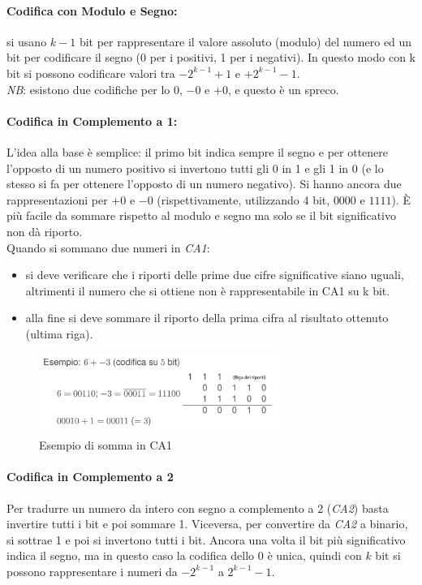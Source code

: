 \documentclass[class=book, crop=false, oneside]{standalone}
\begin{document}
\paragraph*{Codifica con Modulo e Segno:}
si usano \(k-1\) bit per rappresentare il valore assoluto (modulo) del numero  ed un bit per codificare il segno (0 per i positivi, 1 per i negativi). In questo modo con k bit si possono codificare valori tra \(-2^{k-1}+1\) e \(+2^{k-1}-1\).\\
\emph{NB}: esistono due codifiche per lo \(0\), \(-0\) e \(+0\), e questo è un spreco.

\paragraph*{Codifica in Complemento a 1:}
L'idea alla base è semplice: il primo bit indica sempre il segno e per ottenere l'opposto di un numero positivo si invertono tutti gli 0 in 1 e gli 1 in 0 (e lo stesso si fa per ottenere l’opposto di un numero negativo). Si hanno ancora due rappresentazioni per \(+0\) e \(-0\) (rispettivamente, utilizzando 4 bit, \(0000\) e \(1111\)). È più facile da sommare rispetto al modulo e segno ma solo se il bit significativo non dà riporto.\\
Quando si sommano due numeri in \emph{CA1}:
\begin{itemize}[noitemsep]
	\item si deve verificare che i riporti delle prime due cifre significative siano uguali, altrimenti il numero che si ottiene non è rappresentabile in CA1 su k bit.
	\item alla fine si deve sommare il riporto della prima cifra al risultato ottenuto (ultima riga).
\end{itemize}

\begin{figure}[h!]
	\centering
	\includegraphics[width=0.7\textwidth,keepaspectratio]{Somma-CA1.png}
	\caption{Esempio di somma in CA1}
\end{figure}

\paragraph*{Codifica in Complemento a 2}
Per tradurre un numero da intero con segno a complemento a 2 (\emph{CA2}) basta invertire tutti i bit e poi sommare 1. Viceversa, per convertire da \emph{CA2} a binario, si sottrae 1 e poi si invertono tutti i bit. Ancora una volta il bit più significativo indica il segno, ma in questo caso la codifica dello 0 è unica, quindi con \(k\) bit si possono rappresentare i numeri da \(-2^{k-1}\) a \(2^{k-1}-1\).
\end{document}

